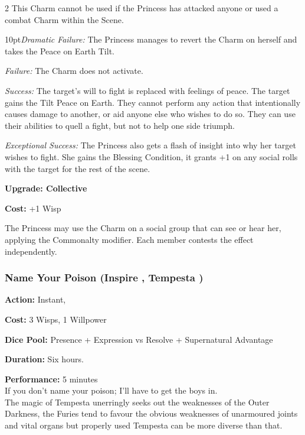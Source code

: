 \begin{multicols}{2}
This Charm cannot be used if the Princess has attacked anyone or used a combat Charm within the Scene.

   \begin{myindentpar}{10pt}\emph{Dramatic Failure:} The Princess manages to revert the Charm on herself and takes the Peace on Earth Tilt.

    \emph{Failure:} The Charm does not activate.

    \emph{Success:} The target's will to fight is replaced with feelings of peace. The target gains the Tilt Peace on Earth. They cannot perform any action that intentionally causes damage to another, or aid anyone else who wishes to do so. They can use their abilities to quell a fight, but not to help one side triumph. 

    \emph{Exceptional Success:} The Princess also gets a flash of insight into why her target wishes to fight. She gains the Blessing Condition, it grants +1 on any social rolls with the target for the rest of the scene.

\textbf{Upgrade: Collective}

\noindent \textbf{Cost:} +1 Wisp

The Princess may use the Charm on a social group that can see or hear her, applying the Commonalty modifier. Each member contests the effect independently.\end{myindentpar}

\subsubsection*{Name Your Poison (Inspire \textbullet\textbullet\textbullet, Tempesta \textbullet\textbullet\textbullet)}

\noindent \textbf{Action:} Instant, 

\noindent \textbf{Cost:} 3 Wisps, 1 Willpower

\noindent \textbf{Dice Pool:} Presence + Expression vs Resolve + Supernatural Advantage

\noindent \textbf{Duration:} Six hours.

\noindent \textbf{Performance:} 5 minutes \\

\noindent If you don't name your poison; I'll have to get the boys in.\\

\noindent The magic of Tempesta unerringly seeks out the weaknesses of the Outer Darkness, the Furies tend to favour the obvious weaknesses of unarmoured joints and vital organs but properly used Tempesta can be more diverse than that.


\end{multicols}
